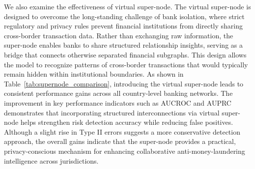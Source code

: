 \documentclass[11pt,english]{article}
\begin{document}
We also examine the effectiveness of virtual super-node. The virtual super-node is designed to overcome the long-standing challenge of bank isolation, where strict regulatory and privacy rules prevent financial institutions from directly sharing cross-border transaction data. Rather than exchanging raw information, the super-node enables banks to share structured relationship insights, serving as a bridge that connects otherwise separated financial subgraphs. This design allows the model to recognize patterns of cross-border transactions that would typically remain hidden within institutional boundaries. As shown in Table~\ref{tab:supernode_comparison}, introducing the virtual super-node leads to consistent performance gains across all country-level banking networks. The improvement in key performance indicators such as AUCROC and AUPRC demonstrates that incorporating structured interconnections via virtual super-node helps strengthen risk detection accuracy while reducing false positives. Although a slight rise in Type II errors suggests a more conservative detection approach, the overall gains indicate that the super-node provides a practical, privacy-conscious mechanism for enhancing collaborative anti-money-laundering intelligence across jurisdictions.
\end{document}
